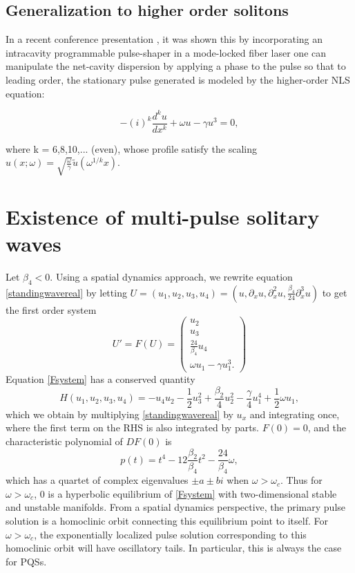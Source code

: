 \documentclass[12pt]{article}
\begin{document}
\subsection{Generalization to higher order solitons}
In a recent conference presentation \cite{Runge2020}, it was shown this by incorporating an intracavity programmable pulse-shaper in a mode-locked fiber laser one can manipulate the net-cavity dispersion by applying a phase to the pulse so that to leading order, the stationary pulse generated is modeled by the higher-order NLS equation:

\begin{equation}\label{HONLS}
-(i)^k\frac{d^k u}{dx^k}+ \omega u - \gamma u^3 = 0,
\end{equation}

\noindent
where k = 6,8,10,... (even), whose profile satisfy the scaling 
$u(x; \omega) = \sqrt{\frac{\omega}{\gamma}}\tilde{u}
(\omega^{1/k}x)$.

\section{Existence of multi-pulse solitary waves}

Let $\beta_4 < 0$. Using a spatial dynamics approach, we rewrite equation \cref{standingwavereal} by letting $U = (u_1, u_2, u_3, u_4) = (u, \partial_x u, \partial_x^2 u, \frac{\beta_4}{24} \partial_x^3 u)$ to get the first order system
\begin{equation}\label{Fsystem}
U' = F(U) = \begin{pmatrix}
u_2 \\ u_3 \\ \frac{24}{\beta_4} u_4 \\ \omega u_1 - \gamma u_1^3.
\end{pmatrix}
\end{equation}
Equation \cref{Fsystem} has a conserved quantity
\begin{equation}\label{FsystemH}
H(u_1, u_2, u_3, u_4) = -u_4 u_2 - \frac{1}{2} u_3^2 + \frac{\beta_2}{4}u_2^2 - \frac{\gamma}{4} u_1^4 + \frac{1}{2}\omega u_1,
\end{equation}
which we obtain by multiplying \cref{standingwavereal} by $u_x$ and integrating once, where the first term on the RHS is also integrated by parts. $F(0) = 0$, and the characteristic polynomial of $DF(0)$ is
\[
p(t) = t^4 - 12\frac{\beta_2}{\beta_4} t^2 - \frac{24}{\beta_4}\omega,
\]
which has a quartet of complex eigenvalues $\pm a \pm b i$ when $\omega > \omega_c$. Thus for $\omega > \omega_c$, 0 is a hyperbolic equilibrium of \cref{Fsystem} with two-dimensional stable and unstable manifolds. From a spatial dynamics perspective, the primary pulse solution is a homoclinic orbit connecting this equilibrium point to itself.  For $\omega > \omega_c$, the exponentially localized pulse solution corresponding to this homoclinic orbit will have oscillatory tails. In particular, this is always the case for PQSs. 
\end{document}

